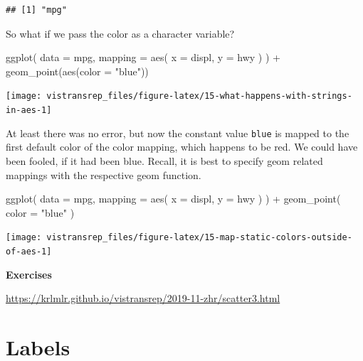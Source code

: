\documentclass[]{book}
\newenvironment{Shaded}{}{}
\newcommand{\DataTypeTok}[1]{#1}
\newcommand{\KeywordTok}[1]{\textcolor[rgb]{0.00,0.00,1.00}{#1}}
\newcommand{\NormalTok}[1]{#1}
\newcommand{\OperatorTok}[1]{#1}
\newcommand{\StringTok}[1]{\textcolor[rgb]{0.00,0.50,0.50}{#1}}
\begin{document}
\begin{verbatim}
## [1] "mpg"
\end{verbatim}

So what if we pass the color as a character variable?

\begin{Shaded}
\begin{Highlighting}[]
\KeywordTok{ggplot}\NormalTok{(}
  \DataTypeTok{data =}\NormalTok{ mpg,}
  \DataTypeTok{mapping =} \KeywordTok{aes}\NormalTok{(}
    \DataTypeTok{x =}\NormalTok{ displ,}
    \DataTypeTok{y =}\NormalTok{ hwy}
\NormalTok{  )}
\NormalTok{) }\OperatorTok{+}
\StringTok{  }\KeywordTok{geom_point}\NormalTok{(}\KeywordTok{aes}\NormalTok{(}\DataTypeTok{color =} \StringTok{"blue"}\NormalTok{))}
\end{Highlighting}
\end{Shaded}

\begin{flushright}\texttt{[image: vistransrep\_files/figure-latex/15-what-happens-with-strings-in-aes-1]} \end{flushright}

At least there was no error, but now the constant value \texttt{blue} is mapped to the first default color of the color mapping, which happens to be red.
We could have been fooled, if it had been blue.
Recall, it is best to specify geom related mappings with the respective geom function.

\begin{Shaded}
\begin{Highlighting}[]
\KeywordTok{ggplot}\NormalTok{(}
  \DataTypeTok{data =}\NormalTok{ mpg,}
  \DataTypeTok{mapping =} \KeywordTok{aes}\NormalTok{(}
    \DataTypeTok{x =}\NormalTok{ displ,}
    \DataTypeTok{y =}\NormalTok{ hwy}
\NormalTok{  )}
\NormalTok{) }\OperatorTok{+}
\StringTok{  }\KeywordTok{geom_point}\NormalTok{(}
    \DataTypeTok{color =} \StringTok{"blue"}
\NormalTok{  )}
\end{Highlighting}
\end{Shaded}

\begin{flushright}\texttt{[image: vistransrep\_files/figure-latex/15-map-static-colors-outside-of-aes-1]} \end{flushright}

\textbf{Exercises}

\url{https://krlmlr.github.io/vistransrep/2019-11-zhr/scatter3.html}

\hypertarget{labels}{%
\section{Labels}\label{labels}}
\end{document}
